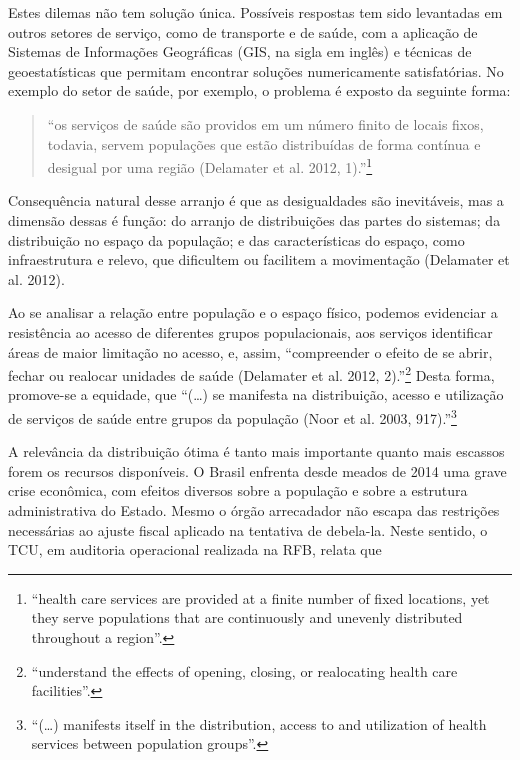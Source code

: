 \documentclass[]{article}
\let\rmarkdownfootnote\footnote%
\def\footnote{\protect\rmarkdownfootnote}
\begin{document}
Estes dilemas não tem solução única. Possíveis respostas tem sido
levantadas em outros setores de serviço, como de transporte e de saúde,
com a aplicação de Sistemas de Informações Geográficas (GIS, na sigla em
inglês) e técnicas de geoestatísticas que permitam encontrar soluções
numericamente satisfatórias. No exemplo do setor de saúde, por exemplo,
o problema é exposto da seguinte forma:

\begin{quote}
``os serviços de saúde são providos em um número finito de locais fixos,
todavia, servem populações que estão distribuídas de forma contínua e
desigual por uma região (Delamater et al. 2012, 1).''\footnote{``health
  care services are provided at a finite number of fixed locations, yet
  they serve populations that are continuously and unevenly distributed
  throughout a region''.}
\end{quote}

Consequência natural desse arranjo é que as desigualdades são
inevitáveis, mas a dimensão dessas é função: do arranjo de distribuições
das partes do sistemas; da distribuição no espaço da população; e das
características do espaço, como infraestrutura e relevo, que dificultem
ou facilitem a movimentação (Delamater et al. 2012).

Ao se analisar a relação entre população e o espaço físico, podemos
evidenciar a resistência ao acesso de diferentes grupos populacionais,
aos serviços identificar áreas de maior limitação no acesso, e, assim,
``compreender o efeito de se abrir, fechar ou realocar unidades de saúde
(Delamater et al. 2012, 2).''\footnote{``understand the effects of
  opening, closing, or realocating health care facilities''.} Desta
forma, promove-se a equidade, que ``(\ldots{}) se manifesta na
distribuição, acesso e utilização de serviços de saúde entre grupos da
população (Noor et al. 2003, 917).''\footnote{``(\ldots{}) manifests
  itself in the distribution, access to and utilization of health
  services between population groups''.}

A relevância da distribuição ótima é tanto mais importante quanto mais
escassos forem os recursos disponíveis. O Brasil enfrenta desde meados
de 2014 uma grave crise econômica, com efeitos diversos sobre a
população e sobre a estrutura administrativa do Estado. Mesmo o órgão
arrecadador não escapa das restrições necessárias ao ajuste fiscal
aplicado na tentativa de debela-la. Neste sentido, o TCU, em auditoria
operacional realizada na RFB, relata que
\end{document}
